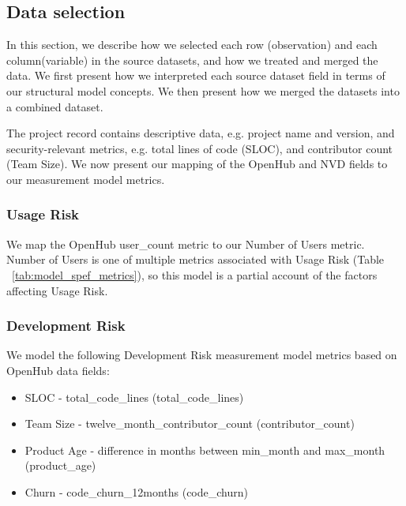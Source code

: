 

\subsection{Data selection}
\label{sec:evaluation_openhub_selection}
In this section, we describe how we selected each row (observation) and each column(variable) in the source datasets, and how we treated and merged the data. We first present how we interpreted each source dataset field in terms of our structural model concepts. We then present how we merged the datasets into a combined dataset.

The project record contains descriptive data, e.g. project name and version, and security-relevant metrics, e.g. total lines of code (SLOC), and contributor count (Team Size). We now present our mapping of the OpenHub and NVD fields to our \ModelAbbr measurement model metrics.

\subsubsection{Usage Risk}
We map the OpenHub user\_count metric to our Number of Users metric. Number of Users is one of multiple metrics associated with Usage Risk (Table ~\ref{tab:model_spef_metrics}), so this model is a partial account of the factors affecting Usage Risk. 

\subsubsection{Development Risk}
\label{sec:evaluation_openhub_selection_risk}
We model the following Development Risk measurement model metrics based on OpenHub data fields:
\begin{itemize}
    \item SLOC - total\_code\_lines (total\_code\_lines)
    \item Team Size - twelve\_month\_contributor\_count (contributor\_count)
    \item Product Age - difference in months between min\_month and max\_month (product\_age) 
    \item Churn - code\_churn\_12months (code\_churn)
\end{itemize}  

